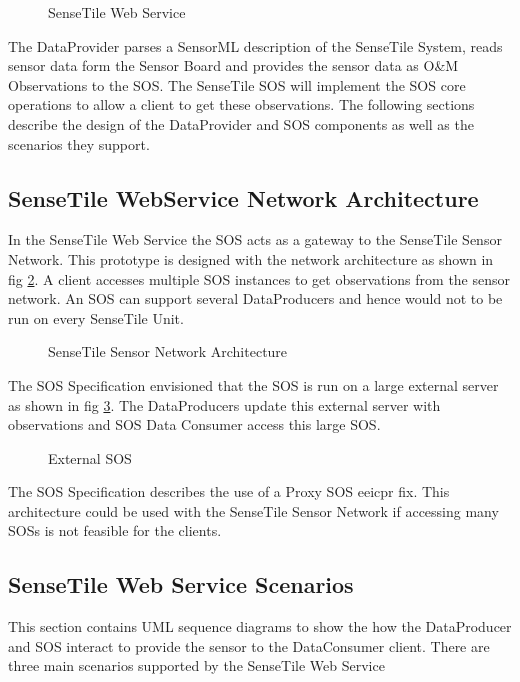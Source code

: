\documentclass[]{final_report}
\begin{document}
\begin{figure}[h]
\centering
{}
\caption{SenseTile Web Service}\label{fig:Deployment_sensetile}
\end{figure}

The DataProvider parses a SensorML description of the SenseTile System, reads sensor data form the Sensor Board and provides the sensor data as O\&M Observations to the SOS. The SenseTile SOS will implement the SOS core operations to allow a client to get these observations. The following sections describe the design of the DataProvider and SOS components as well as the scenarios they support.

\subsection{SenseTile WebService Network Architecture}
\label{subsec:SenseTile WebService Network Architecture}
In the SenseTile Web Service the SOS acts as a gateway to the SenseTile Sensor Network. This prototype is designed with the network architecture as shown in fig \ref{fig:Deployment_network}. A client accesses multiple SOS instances to get observations from the sensor network. An SOS can support several DataProducers and hence would not to be run on every SenseTile Unit. 

\begin{figure}[h]
\caption{SenseTile Sensor Network Architecture}\label{fig:Deployment_network}
\end{figure}
The SOS Specification envisioned that the SOS is run on a large external server as shown in fig \ref{fig:Deployment_ext_sos}. The DataProducers update this external server with observations and SOS Data Consumer access this large SOS.
\begin{figure}[h]
\centering
{}
\caption{External SOS}\label{fig:Deployment_ext_sos}
\end{figure}

The SOS Specification describes the use of a Proxy SOS eeicpr fix. This architecture could be used with the SenseTile Sensor Network if accessing many SOSs is not feasible for the clients.

\newpage
\subsection{SenseTile Web Service Scenarios}
This section contains UML sequence diagrams to show the how the DataProducer and SOS interact to provide the sensor to the DataConsumer client. There are three main scenarios supported by the SenseTile Web Service 
\end{document}

